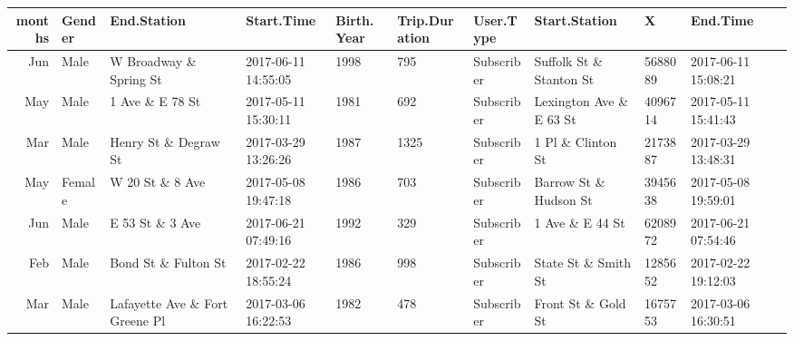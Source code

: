 \documentclass[11pt]{article}
\begin{document}
    \begin{tabular}{r|llllllllll}
 months & Gender & End.Station & Start.Time & Birth.Year & Trip.Duration & User.Type & Start.Station & X & End.Time\\
\hline
	 Jun                              & Male                             & W Broadway \& Spring St         & 2017-06-11 14:55:05              & 1998                             &  795                             & Subscriber                       & Suffolk St \& Stanton St        & 5688089                          & 2017-06-11 15:08:21             \\
	 May                              & Male                             & 1 Ave \& E 78 St                & 2017-05-11 15:30:11              & 1981                             &  692                             & Subscriber                       & Lexington Ave \& E 63 St        & 4096714                          & 2017-05-11 15:41:43             \\
	 Mar                              & Male                             & Henry St \& Degraw St           & 2017-03-29 13:26:26              & 1987                             & 1325                             & Subscriber                       & 1 Pl \& Clinton St              & 2173887                          & 2017-03-29 13:48:31             \\
	 May                              & Female                           & W 20 St \& 8 Ave                & 2017-05-08 19:47:18              & 1986                             &  703                             & Subscriber                       & Barrow St \& Hudson St          & 3945638                          & 2017-05-08 19:59:01             \\
	 Jun                              & Male                             & E 53 St \& 3 Ave                & 2017-06-21 07:49:16              & 1992                             &  329                             & Subscriber                       & 1 Ave \& E 44 St                & 6208972                          & 2017-06-21 07:54:46             \\
	 Feb                              & Male                             & Bond St \& Fulton St            & 2017-02-22 18:55:24              & 1986                             &  998                             & Subscriber                       & State St \& Smith St            & 1285652                          & 2017-02-22 19:12:03             \\
	 Mar                              & Male                             & Lafayette Ave \& Fort Greene Pl & 2017-03-06 16:22:53              & 1982                             &  478                             & Subscriber                       & Front St \& Gold St             & 1675753                          & 2017-03-06 16:30:51             \\

\end{tabular}
\end{document}
